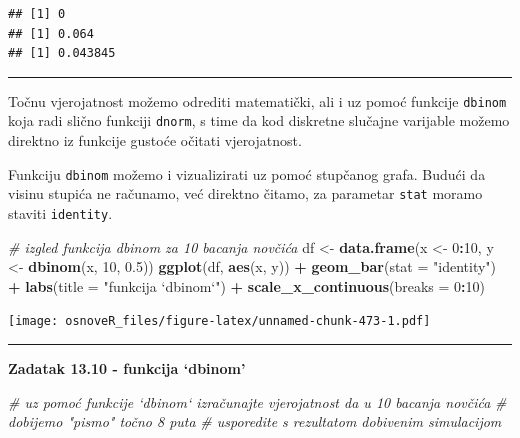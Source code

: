 \documentclass[]{book}
\newenvironment{Shaded}{\begin{snugshade}}{\end{snugshade}}
\newcommand{\KeywordTok}[1]{\textcolor[rgb]{0.13,0.29,0.53}{\textbf{#1}}}
\newcommand{\DataTypeTok}[1]{\textcolor[rgb]{0.13,0.29,0.53}{#1}}
\newcommand{\DecValTok}[1]{\textcolor[rgb]{0.00,0.00,0.81}{#1}}
\newcommand{\FloatTok}[1]{\textcolor[rgb]{0.00,0.00,0.81}{#1}}
\newcommand{\StringTok}[1]{\textcolor[rgb]{0.31,0.60,0.02}{#1}}
\newcommand{\CommentTok}[1]{\textcolor[rgb]{0.56,0.35,0.01}{\textit{#1}}}
\newcommand{\OperatorTok}[1]{\textcolor[rgb]{0.81,0.36,0.00}{\textbf{#1}}}
\newcommand{\NormalTok}[1]{#1}
\theoremstyle{definition}
\theoremstyle{definition}
\theoremstyle{definition}
\theoremstyle{remark}
\begin{document}
\begin{verbatim}
## [1] 0
## [1] 0.064
## [1] 0.043845
\end{verbatim}

\begin{center}\rule{0.5\linewidth}{\linethickness}\end{center}

Točnu vjerojatnost možemo odrediti matematički, ali i uz pomoć funkcije
\texttt{dbinom} koja radi slično funkciji \texttt{dnorm}, s time da kod
diskretne slučajne varijable možemo direktno iz funkcije gustoće očitati
vjerojatnost.

Funkciju \texttt{dbinom} možemo i vizualizirati uz pomoć stupčanog
grafa. Budući da visinu stupića ne računamo, već direktno čitamo, za
parametar \texttt{stat} moramo staviti \texttt{identity}.

\begin{Shaded}
\begin{Highlighting}[]
\CommentTok{# izgled funkcija dbinom za 10 bacanja novčića}
\NormalTok{df <-}\StringTok{ }\KeywordTok{data.frame}\NormalTok{(x <-}\StringTok{ }\DecValTok{0}\OperatorTok{:}\DecValTok{10}\NormalTok{, y <-}\StringTok{ }\KeywordTok{dbinom}\NormalTok{(x, }\DecValTok{10}\NormalTok{, }\FloatTok{0.5}\NormalTok{))}
\KeywordTok{ggplot}\NormalTok{(df, }\KeywordTok{aes}\NormalTok{(x, y)) }\OperatorTok{+}\StringTok{ }\KeywordTok{geom_bar}\NormalTok{(}\DataTypeTok{stat =} \StringTok{"identity"}\NormalTok{) }\OperatorTok{+}\StringTok{ }\KeywordTok{labs}\NormalTok{(}\DataTypeTok{title =} \StringTok{"funkcija `dbinom`"}\NormalTok{) }\OperatorTok{+}
\StringTok{  }\KeywordTok{scale_x_continuous}\NormalTok{(}\DataTypeTok{breaks =} \DecValTok{0}\OperatorTok{:}\DecValTok{10}\NormalTok{)}
\end{Highlighting}
\end{Shaded}

\texttt{[image: osnoveR\_files/figure-latex/unnamed-chunk-473-1.pdf]}

\begin{center}\rule{0.5\linewidth}{\linethickness}\end{center}

\textbf{Zadatak 13.10 - funkcija `dbinom'}

\begin{Shaded}
\begin{Highlighting}[]
\CommentTok{# uz pomoć funkcije `dbinom` izračunajte vjerojatnost da u 10 bacanja novčića}
\CommentTok{# dobijemo "pismo" točno 8 puta}
\CommentTok{# usporedite s rezultatom dobivenim simulacijom}
\end{Highlighting}
\end{Shaded}
\end{document}
